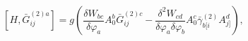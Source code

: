 \begin{equation}
\left[ H,\bar{G}_{ij}^{(2)a}\right] =g\left( \frac{\delta W_{bc}}{\delta
\varphi _{a}}A_{0}^{b}\bar{G}_{ij}^{(2)c}-\frac{\delta ^{2}W_{cd}}{\delta
\varphi _{a}\delta \varphi _{b}}A_{0}^{c}\bar{\gamma}_{b[i}^{(2)}A_{j]}^{d}%
\right) ,  \label{i37}
\end{equation}

